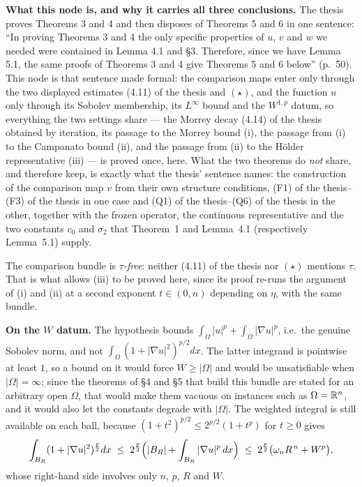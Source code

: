 \begin{helper}
\noindent\textbf{What this node is, and why it carries all three conclusions.}
The thesis proves Theorems 3 and 4 and then disposes of Theorems 5 and 6 in one
sentence: ``In proving Theorems 3 and 4 the only specific properties of $u$, $v$
and $w$ we needed were contained in Lemma 4.1 and \S3.  Therefore, since we have
Lemma 5.1, the same proofs of Theorems 3 and 4 give Theorems 5 and 6 below''
(p.~50).  This node is that sentence made formal: the comparison maps enter only
through the two displayed estimates (4.11) of the thesis and $(\star)$, and the
function $u$ only through its Sobolev membership, its $L^\infty$ bound and the
$W^{1,p}$ datum, so everything the two settings share --- the Morrey decay
(4.14) of the thesis obtained by iteration, its passage to the Morrey bound (i), the
passage from (i) to the Campanato bound (ii), and the passage from (ii) to the
H\"older representative (iii) --- is proved once, here.  What the two theorems
do \emph{not} share, and therefore keep, is exactly what the thesis' sentence
names: the construction of the comparison map $v$ from their own structure
conditions, (F1) of the thesis--(F3) of the thesis in one case and
(Q1) of the thesis--(Q6) of the thesis in the other, together with the frozen operator,
the continuous representative and the two constants $c_0$ and $\sigma_2$ that
Theorem~1 and Lemma~4.1 (respectively Lemma~5.1) supply.

The comparison bundle is \emph{$\tau$-free}: neither (4.11) of the thesis nor
$(\star)$ mentions $\tau$.  That is what allows (iii) to be proved here, since
its proof re-runs the argument of (i) and (ii) at a second exponent
$t\in(0,n)$ depending on $\eta$, with the same bundle.

\noindent\textbf{On the $W$ datum.}  The hypothesis bounds
$\int_\Omega|u|^p+\int_\Omega|\nabla u|^p$, i.e.\ the genuine Sobolev norm, and
not $\int_\Omega(1+|\nabla u|^2)^{p/2}dx$.  The latter integrand is pointwise at
least $1$, so a bound on it would force $W\ge|\Omega|$ and would be
unsatisfiable when $|\Omega|=\infty$; since the theorems of \S4 and \S5 that
build this bundle are stated for an arbitrary open $\Omega$, that would make
them vacuous on instances such as $\Omega=\mathbb{R}^n$, and it would also let the
constants degrade with $|\Omega|$.  The weighted integral is still available on
each ball, because $(1+t^2)^{p/2}\le2^{p/2}(1+t^p)$ for $t\ge0$ gives
\[
\int_{B_R}(1+|\nabla u|^2)^{\frac p2}dx
\;\le\;2^{\frac p2}\Bigl(|B_R|+\int_{B_R}|\nabla u|^p\,dx\Bigr)
\;\le\;2^{\frac p2}\bigl(\omega_nR^{\,n}+W^p\bigr),
\]
whose right-hand side involves only $n$, $p$, $R$ and $W$.
\end{helper}

